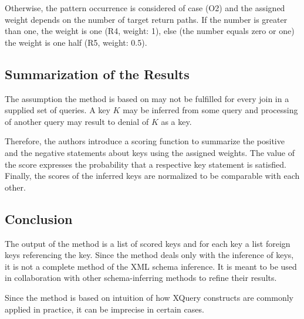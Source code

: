 Otherwise, the pattern occurrence is considered of case (O2) and the assigned weight depends on the number of target return paths. If the number is greater than one, the weight is one (R4, weight: 1), else (the number equals zero or one) the weight is one half (R5, weight: 0.5).

\subsection{Summarization of the Results}

The assumption the method is based on may not be fulfilled for every join in a supplied set of queries. A key $K$ may be inferred from some query and processing of another query may result to denial of $K$ as a key.

Therefore, the authors introduce a scoring function to summarize the positive and the negative statements about keys using the assigned weights. The value of the score expresses the probability that a respective key statement is satisfied. Finally, the scores of the inferred keys are normalized to be comparable with each other.

\subsection{Conclusion}
The output of the method is a list of scored keys and for each key a list foreign keys referencing the key. Since the method deals only with the inference of keys, it is not a complete method of the XML schema inference. It is meant to be used in collaboration with other schema-inferring methods to refine their results.

Since the method is based on intuition of how XQuery constructs are commonly applied in practice, it can be imprecise in certain cases.


